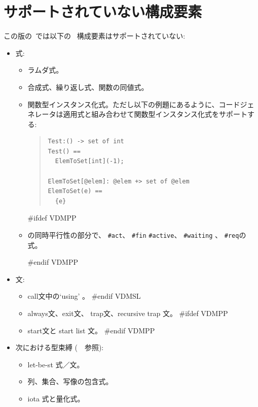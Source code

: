 \documentclass[\pformat,12pt]{jarticle}
\begin{document}
\section{サポートされていない構成要素}\label{sec:unsupported}

 この版の\tcg\ では以下の \VDM\ 構成要素はサポートされていない:

\begin{itemize}

\item 式:

  \begin{itemize}
  \item ラムダ式。
  \item 合成式、繰り返し式、関数の同値式。
  \item 関数型インスタンス化式。ただし以下の例題にあるように、コードジェネレータは適用式と組み合わせて関数型インスタンス化式をサポートする:

\begin{quote}
\begin{verbatim}
Test:() -> set of int
Test() ==
  ElemToSet[int](-1);

ElemToSet[@elem]: @elem +> set of @elem
ElemToSet(e) ==
  {e}
\end{verbatim}
\end{quote}

#ifdef VDMPP
\item  \VDM{}の同時平行性の部分で、 {\tt \#act}、 {\tt \#fin} {\tt \#active}、 {\tt \#waiting} 、 {\tt \#req}の式。

#endif VDMPP
  \end{itemize}

\item 文: 

  \begin{itemize}
#ifdef VDMSL
  \item call文中の`{\sf using}' 。
#endif VDMSL
  \item always文、exit文、 trap文、recursive trap 文。
#ifdef VDMPP
  \item start文と start list 文。
#endif VDMPP
  \end{itemize}

\item 次における型束縛 (\langmancite　参照):

  \begin{itemize}
  \item let-be-st 式／文。
  \item 列、集合、写像の包含式。
  \item iota 式と量化式。
  \end{itemize}


\end{itemize}
\end{document}
